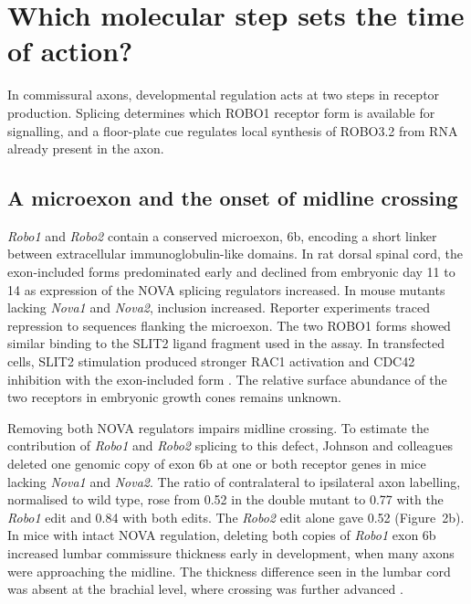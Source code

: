 \documentclass[11pt,a4paper]{article}
\begin{document}
\section{Which molecular step sets the time of action?}

In commissural axons, developmental regulation acts at two steps in receptor production. Splicing determines which ROBO1 receptor form is available for signalling, and a floor-plate cue regulates local synthesis of ROBO3.2 from RNA already present in the axon.

\subsection{A microexon and the onset of midline crossing}

\textit{Robo1} and \textit{Robo2} contain a conserved microexon, 6b, encoding a short linker between extracellular immunoglobulin-like domains. In rat dorsal spinal cord, the exon-included forms predominated early and declined from embryonic day 11 to 14 as expression of the NOVA splicing regulators increased. In mouse mutants lacking \textit{Nova1} and \textit{Nova2}, inclusion increased. Reporter experiments traced repression to sequences flanking the microexon. The two ROBO1 forms showed similar binding to the SLIT2 ligand fragment used in the assay. In transfected cells, SLIT2 stimulation produced stronger RAC1 activation and CDC42 inhibition with the exon-included form \cite{Johnson2019}. The relative surface abundance of the two receptors in embryonic growth cones remains unknown.

Removing both NOVA regulators impairs midline crossing. To estimate the contribution of \textit{Robo1} and \textit{Robo2} splicing to this defect, Johnson and colleagues deleted one genomic copy of exon 6b at one or both receptor genes in mice lacking \textit{Nova1} and \textit{Nova2}. The ratio of contralateral to ipsilateral axon labelling, normalised to wild type, rose from 0.52 in the double mutant to 0.77 with the \textit{Robo1} edit and 0.84 with both edits. The \textit{Robo2} edit alone gave 0.52 (Figure~2b). In mice with intact NOVA regulation, deleting both copies of \textit{Robo1} exon 6b increased lumbar commissure thickness early in development, when many axons were approaching the midline. The thickness difference seen in the lumbar cord was absent at the brachial level, where crossing was further advanced \cite{Johnson2019}.
\end{document}
